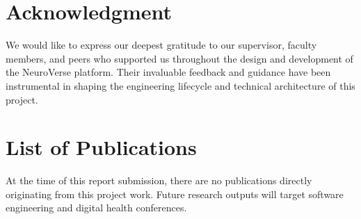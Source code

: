 \documentclass[a4paper,11pt]{report}
\begin{document}
\clearpage

\begin{abstract}
\noindent Mental health care accessibility remains a significant challenge due to systemic barriers, stigma, and fragmentation of resources. NeuroVerse is proposed as a holistic, full-stack web application developed utilizing the MERN stack (MongoDB, Express.js, React, Node.js) and optimized with the Vite build tool. The system employs a 3-tier Client-Server architecture and a robust JSON Web Token (JWT) authentication model to securely serve three distinct user roles: Users, Therapists, and Administrators. This report thoroughly documents the software engineering lifecycle of NeuroVerse, encompassing the project vision, methodology selection, comprehensive Work Breakdown Structure (WBS), risk management strategies, and extensive effort estimations using Wideband Delphi, Function Point Analysis (FPA), and COCOMO modeling. By bridging self-care tools—such as mood and habit tracking—with professional therapeutic support and community forums, NeuroVerse aims to democratize mental health resources.
\end{abstract}

\clearpage

\chapter*{Acknowledgment}
We would like to express our deepest gratitude to our supervisor, faculty members, and peers who supported us throughout the design and development of the NeuroVerse platform. Their invaluable feedback and guidance have been instrumental in shaping the engineering lifecycle and technical architecture of this project.

\clearpage

\chapter*{List of Publications}
At the time of this report submission, there are no publications directly originating from this project work. Future research outputs will target software engineering and digital health conferences.
\end{document}
